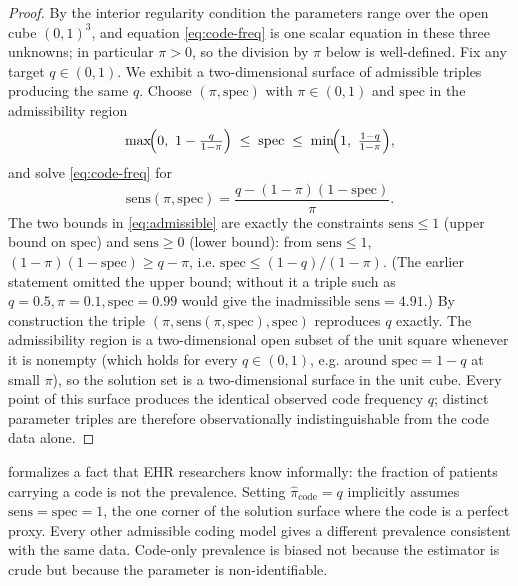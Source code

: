 \begin{proof}
By the interior regularity condition the parameters range over the open
cube $(0,1)^3$, and equation \eqref{eq:code-freq} is one scalar equation
in these three unknowns; in particular $\pi > 0$, so the division by
$\pi$ below is well-defined. Fix any target $q \in (0,1)$. We exhibit a
two-dimensional surface of admissible triples producing the same $q$.
Choose $(\pi, \mathrm{spec})$ with $\pi \in (0,1)$ and $\mathrm{spec}$
in the admissibility region
\begin{equation}
  \max\!\Bigl(0,\ 1 - \tfrac{q}{1-\pi}\Bigr)
  \;\le\; \mathrm{spec} \;\le\;
  \min\!\Bigl(1,\ \tfrac{1-q}{1-\pi}\Bigr),
  \label{eq:admissible}
\end{equation}
and solve \eqref{eq:code-freq} for
\begin{equation}
  \mathrm{sens}(\pi, \mathrm{spec})
    = \frac{q - (1-\pi)(1-\mathrm{spec})}{\pi}.
  \label{eq:glass-sens}
\end{equation}
The two bounds in \eqref{eq:admissible} are exactly the constraints
$\mathrm{sens} \le 1$ (upper bound on $\mathrm{spec}$) and
$\mathrm{sens} \ge 0$ (lower bound): from $\mathrm{sens} \le 1$,
$(1-\pi)(1-\mathrm{spec}) \ge q - \pi$, i.e.
$\mathrm{spec} \le (1-q)/(1-\pi)$. (The earlier statement omitted the
upper bound; without it a triple such as $q=0.5, \pi=0.1,
\mathrm{spec}=0.99$ would give the inadmissible $\mathrm{sens}=4.91$.)
By construction the triple
$(\pi, \mathrm{sens}(\pi, \mathrm{spec}), \mathrm{spec})$
reproduces $q$ exactly. The admissibility region is a two-dimensional
open subset of the unit square whenever it is nonempty (which holds
for every $q \in (0,1)$, e.g. around $\mathrm{spec} = 1-q$ at small
$\pi$), so the solution set is a two-dimensional surface in the unit
cube. Every point of this
surface produces the identical observed code frequency $q$; distinct
parameter triples are therefore observationally indistinguishable from
the code data alone.
\end{proof}

 formalizes a fact that EHR researchers know
informally: the fraction of patients carrying a code is not the
prevalence. Setting $\hat\pi_{\text{code}} = q$ implicitly assumes
$\mathrm{sens} = \mathrm{spec} = 1$, the one corner of the solution
surface where the code is a perfect proxy. Every other admissible
coding model gives a different prevalence consistent with the same
data. Code-only prevalence is biased not because the estimator is
crude but because the parameter is non-identifiable.

